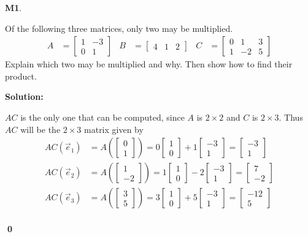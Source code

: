 \documentclass{article}
\newenvironment{problem}[1]
{
  \begin{flushleft}
  \textbf{#1}.
  \ignorespaces
}
{
  \end{flushleft}
}
\newenvironment{solution}
{
  \ignorespaces
  \textbf{Solution:}
}
{
  \ignorespacesafterend
  \begin{flushright}
  {\bfseries \qed}
  \end{flushright}
}
\begin{document}
\begin{problem}{M1}
Of the following three matrices, only two may be multiplied.
\begin{align*}
A &= \begin{bmatrix} 1 & -3 \\ 0 & 1 \end{bmatrix} & B&= \begin{bmatrix} 4 & 1 & 2 \end{bmatrix} & C&= \begin{bmatrix} 0 & 1 & 3 \\ 1 & -2 & 5 \end{bmatrix}
\end{align*}
Explain which two may be multiplied and why. Then show how to find their product.
\end{problem}
\begin{solution}
\(AC\) is the only one that can be computed, since \(A\) is \(2\times 2\)
and \(C\) is \(2\times 3\). Thus \(AC\) will be the \(2\times 3\) matrix
given by
\begin{align*}
AC\left( \vec{e}_1 \right) &= A \left( \begin{bmatrix} 0 \\ 1 \end{bmatrix} \right) = 0 \begin{bmatrix} 1 \\ 0 \end{bmatrix} + 1\begin{bmatrix} -3 \\ 1 \end{bmatrix} = \begin{bmatrix} -3 \\ 1 \end{bmatrix} \\
AC\left( \vec{e}_2 \right) &= A \left( \begin{bmatrix} 1 \\ -2 \end{bmatrix} \right) = 1 \begin{bmatrix} 1 \\ 0 \end{bmatrix} -2\begin{bmatrix} -3 \\ 1 \end{bmatrix} = \begin{bmatrix} 7 \\ -2 \end{bmatrix} \\
AC\left( \vec{e}_3 \right) &= A \left( \begin{bmatrix} 3 \\ 5 \end{bmatrix} \right) = 3 \begin{bmatrix} 1 \\ 0 \end{bmatrix} + 5\begin{bmatrix} -3 \\ 1 \end{bmatrix} = \begin{bmatrix} -12 \\ 5 \end{bmatrix} \\

\end{align*}
\end{solution}
\end{document}
